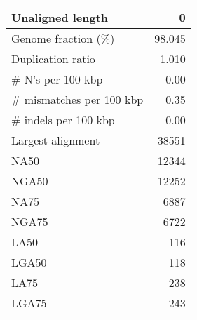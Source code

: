 \documentclass[12pt,a4paper]{article}
\begin{document}
\begin{table}[ht]
\begin{center}
\begin{tabular}{|l*{1}{|r}|}
Unaligned length & 0 \\ \hline
Genome fraction (\%) & 98.045 \\ \hline
Duplication ratio & 1.010 \\ \hline
\# N's per 100 kbp & 0.00 \\ \hline
\# mismatches per 100 kbp & 0.35 \\ \hline
\# indels per 100 kbp & 0.00 \\ \hline
Largest alignment & 38551 \\ \hline
NA50 & 12344 \\ \hline
NGA50 & 12252 \\ \hline
NA75 & 6887 \\ \hline
NGA75 & 6722 \\ \hline
LA50 & 116 \\ \hline
LGA50 & 118 \\ \hline
LA75 & 238 \\ \hline
LGA75 & 243 \\ \hline
\end{tabular}
\end{center}
\end{table}
\end{document}

